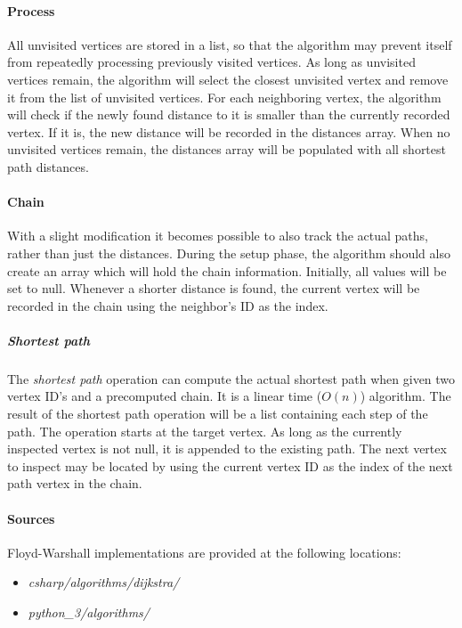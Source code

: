 \documentclass{article}
\begin{document}
\paragraph{Process}
All unvisited vertices are stored in a list, so that the algorithm may prevent itself from repeatedly
processing previously visited vertices. As long as unvisited vertices remain, the algorithm will select the closest
unvisited vertex and remove it from the list of unvisited vertices. For each neighboring vertex, the algorithm will
check if the newly found distance to it is smaller than the currently recorded vertex. If it is, the new distance
will be recorded in the distances array. When no unvisited vertices remain, the distances array will be populated
with all shortest path distances.

\paragraph{Chain}
With a slight modification it becomes possible to also track the actual paths, rather than just the distances.
During the setup phase, the algorithm should also create an array which will hold the chain information.
Initially, all values will be set to null. Whenever a shorter distance is found, the current vertex will be
recorded in the chain using the neighbor's ID as the index.

\subparagraph{Shortest path}
The {\em shortest path} operation can compute the actual shortest path when given two vertex ID's and a precomputed
chain. It is a linear time (\(O(n)\)) algorithm. The result of the shortest path operation will be a list containing
each step of the path. The operation starts at the target vertex. As long as the currently inspected vertex is not
null, it is appended to the existing path. The next vertex to inspect may be located by using the current vertex ID
as the index of the next path vertex in the chain.

\paragraph{Sources}
Floyd-Warshall implementations are provided at the following locations:
\begin{itemize}
\item{{\em csharp/algorithms/dijkstra/}}
\item{{\em python\_3/algorithms/}}
\end{itemize}


\end{document}
